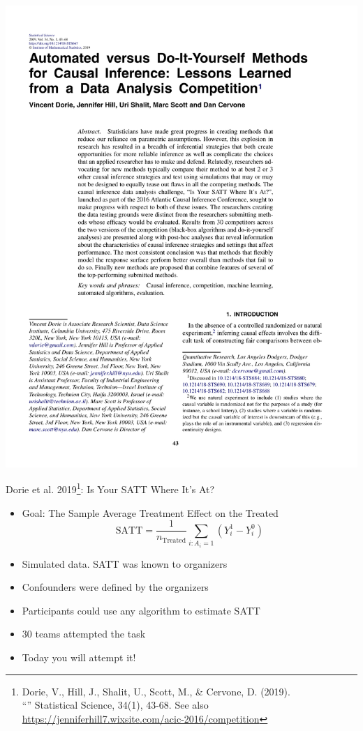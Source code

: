 \documentclass{beamer}
\newcommand\blue[1]{\color{blue}#1}
\newcommand\bref[2]{\href{#1}{\color{blue}{#2}}}
\begin{document}
\begin{frame}
\centering
\includegraphics[height = \textheight]{figures/dorie_p1}
\end{frame}

\begin{frame}{Dorie et al. 2019\footnote{
Dorie, V., Hill, J., Shalit, U., Scott, M., \& Cervone, D. (2019).\\
``\bref{https://projecteuclid.org/journals/statistical-science/volume-34/issue-1/Automated-versus-Do-It-Yourself-Methods-for-Causal-Inference/10.1214/18-STS667.full}{Automated versus do-it-yourself methods for causal inference: Lessons learned from a data analysis competition.}'' Statistical Science, 34(1), 43-68. See also \blue{\url{https://jenniferhill7.wixsite.com/acic-2016/competition}}}: Is Your SATT Where It's At?}

\begin{itemize} \pause
\item Goal: The Sample Average Treatment Effect on the Treated
$$\text{SATT} = \frac{1}{n_\text{Treated}}\sum_{i:A_i = 1} \left(Y_i^1 - Y_i^0\right)$$ \pause
\item Simulated data. SATT was known to organizers \pause
\item Confounders were defined by the organizers \pause
\item Participants could use any algorithm to estimate SATT \pause
\item 30 teams attempted the task \pause
\item Today you will attempt it!
\end{itemize}

\end{frame}
\end{document}
